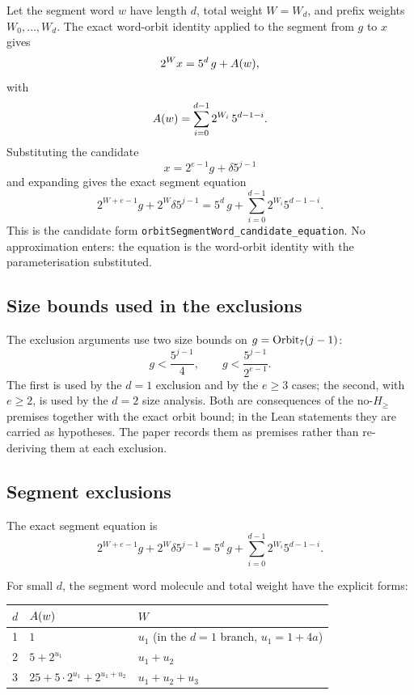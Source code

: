 Let the segment word $w$ have length $d$, total weight $W=W_d$, and
prefix weights $W_0,\dots,W_d$.  The exact word-orbit identity applied
to the segment from $g$ to $x$ gives
\begin{equation*}
  2^W x=5^d\,g+A(w),
\end{equation*}
with
\begin{equation*}
  A(w)=\sum_{i=0}^{d-1}2^{W_i}\,5^{d-1-i}.
\end{equation*}
Substituting the candidate
\begin{equation*}
  x=2^{e-1}g+\delta5^{j-1}
\end{equation*}
and expanding gives the exact segment equation
\begin{equation*}
  2^{W+e-1}g+2^W\delta5^{j-1}
    =5^d\,g+\sum_{i=0}^{d-1}2^{W_i}5^{d-1-i}.
\end{equation*}
This is the candidate form
\texttt{orbitSegmentWord\_\allowbreak candidate\_\allowbreak equation}.
No approximation enters: the equation is the word-orbit identity with
the parameterisation substituted.

\subsection{Size bounds used in the exclusions}

The exclusion arguments use two size bounds on $g=\mathrm{Orbit}_7(j-1)$:
\begin{equation*}
  g<\frac{5^{j-1}}{4},
  \qquad
  g<\frac{5^{j-1}}{2^{e-1}}.
\end{equation*}
The first is used by the $d=1$ exclusion and by the $e\ge3$ cases;
the second, with $e\ge2$, is used by the $d=2$ size analysis.  Both
are consequences of the no-$H_{\ge}$ premises together with the exact
orbit bound; in the Lean statements they are carried as hypotheses.
The paper records them as premises rather than re-deriving them at
each exclusion.

\subsection{Segment exclusions}

The exact segment equation is
\begin{equation*}
  2^{W+e-1}g+2^W\delta5^{j-1}
    =5^d\,g+\sum_{i=0}^{d-1}2^{W_i}5^{d-1-i}.
\end{equation*}

For small $d$, the segment word molecule and total weight have the
explicit forms:
\begin{center}
\small
\begin{tabular}{@{}lll@{}}
\toprule
$d$ & $A(w)$ & $W$ \\
\midrule
1 & $1$ & $u_1$ (in the $d=1$ branch, $u_1=1+4a$) \\
2 & $5+2^{u_1}$ & $u_1+u_2$ \\
3 & $25+5\cdot2^{u_1}+2^{u_1+u_2}$ & $u_1+u_2+u_3$ \\
\bottomrule
\end{tabular}
\end{center}

